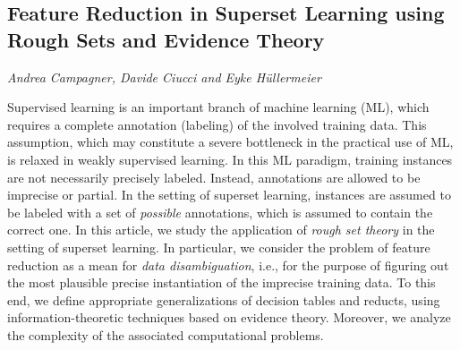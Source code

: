 \documentclass[../booklet.tex]{subfiles}
\begin{document}
\subsection[Feature Reduction in Superset Learning using Rough Sets and Evidence Theory. {\it Andrea Campagner, Davide Ciucci and Eyke Hüllermeier}]{Feature Reduction in Superset Learning using Rough Sets and Evidence Theory}
  

\begin{center}
  {\it Andrea Campagner, Davide Ciucci and Eyke Hüllermeier}
\end{center}



Supervised learning is an important branch of machine learning (ML), which requires a complete annotation (labeling) of the involved training data. This assumption, which may constitute a severe bottleneck in the practical use of ML, is relaxed in weakly supervised learning. In this ML paradigm, training instances are not necessarily precisely labeled. Instead, annotations are allowed to be imprecise or partial. In the setting of superset learning,  instances are assumed to be labeled with a set of \emph{possible} annotations, which is assumed to contain the correct one.
In this article, we study the application of \emph{rough set theory} in the setting of superset learning. In particular, we consider the problem of feature reduction as a mean for \emph{data disambiguation}, i.e., for the purpose of figuring out the most plausible precise instantiation of the imprecise training data.
 To this end, we define appropriate generalizations of decision tables and reducts, using information-theoretic techniques based on evidence theory. Moreover, we analyze the complexity of the associated computational problems.
\end{document}
